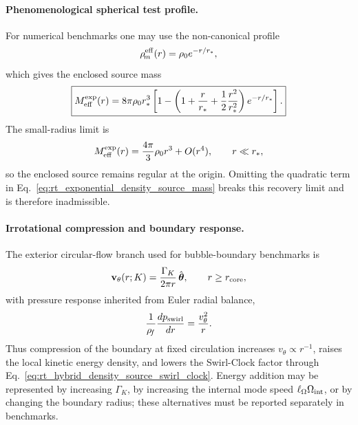 \paragraph{Phenomenological spherical test profile.}
For numerical benchmarks one may use the non-canonical profile
\begin{equation}
\rho_{\!m}^{\rm eff}(r)=\rho_0 e^{-r/r_*},
\end{equation}
which gives the enclosed source mass
\begin{equation}
\boxed{
M_{\rm eff}^{\rm exp}(r)
=
8\pi\rho_0 r_*^3
\left[
1-
\left(
1+\frac{r}{r_*}
+\frac{1}{2}\frac{r^2}{r_*^2}
\right)e^{-r/r_*}
\right].
}
\label{eq:rt_exponential_density_source_mass}
\end{equation}
The small-radius limit is
\begin{equation}
M_{\rm eff}^{\rm exp}(r)
=
\frac{4\pi}{3}\rho_0 r^3+O(r^4),
\qquad r\ll r_*,
\end{equation}
so the enclosed source remains regular at the origin.  Omitting the quadratic
term in Eq.~\eqref{eq:rt_exponential_density_source_mass} breaks this recovery
limit and is therefore inadmissible.

\paragraph{Irrotational compression and boundary response.}
The exterior circular-flow branch used for bubble-boundary benchmarks is
\begin{equation}
\mathbf{v}_{\theta}(r;K)
=\frac{\Gamma_K}{2\pi r}\,\hat{\boldsymbol{\theta}},
\qquad r\ge r_{\rm core},
\label{eq:rt_irrotational_boundary_velocity}
\end{equation}
with pressure response inherited from Euler radial balance,
\begin{equation}
\frac{1}{\rho_{\!f}}\frac{dp_{\rm swirl}}{dr}
=\frac{v_{\theta}^{2}}{r}.
\label{eq:rt_boundary_pressure_balance}
\end{equation}
Thus compression of the boundary at fixed circulation increases
$v_{\theta}\propto r^{-1}$, raises the local kinetic energy density, and lowers
the Swirl-Clock factor through Eq.~\eqref{eq:rt_hybrid_density_source_swirl_clock}.
Energy addition may be represented by increasing $\Gamma_K$, by increasing the
internal mode speed $\ell_{\Omega}\Omega_{\rm int}$, or by changing the boundary
radius; these alternatives must be reported separately in benchmarks.

